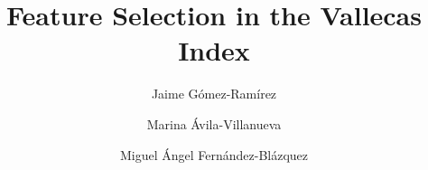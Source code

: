 \documentclass[preprint,12pt]{elsarticle}
\begin{document}
\begin{frontmatter}



\title{Feature Selection in the Vallecas Index}


\author{Jaime Gómez-Ramírez}
\author{Marina Ávila-Villanueva}
\author{Miguel Ángel Fernández-Blázquez}

\address{Fundaci\'on Reina Sof\'ia \\     Centre for Research in Neurodegenarative Diseases (Fundaci\'on CIEN) \\ \emph{Valderrebollo, 5, 28031 Madrid, Spain}}



\end{frontmatter}
\end{document}
